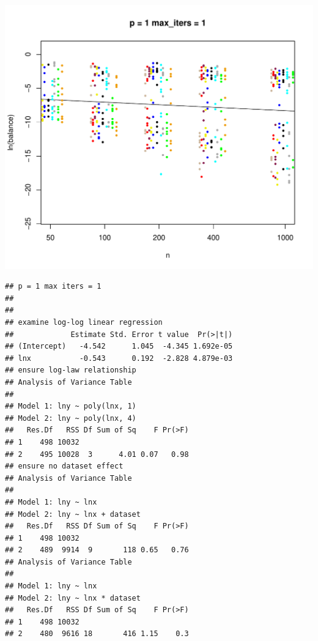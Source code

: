 \documentclass{article}\usepackage[]{graphicx}\usepackage[]{color}
\makeatletter
\def\maxwidth{ %
  \ifdim\Gin@nat@width>\linewidth
    \linewidth
  \else
    \Gin@nat@width
  \fi
}
\newenvironment{kframe}{%
 \def\at@end@of@kframe{}%
 \ifinner\ifhmode%
  \def\at@end@of@kframe{\end{minipage}}%
  \begin{minipage}{\columnwidth}%
 \fi\fi%
 \def\FrameCommand##1{\hskip\@totalleftmargin \hskip-\fboxsep
 \colorbox{shadecolor}{##1}\hskip-\fboxsep
     \hskip-\linewidth \hskip-\@totalleftmargin \hskip\columnwidth}%
 \MakeFramed {\advance\hsize-\width
   \@totalleftmargin\z@ \linewidth\hsize
   \@setminipage}}%
 {\par\unskip\endMakeFramed%
 \at@end@of@kframe}
\newenvironment{knitrout}{}{} %
\makeatother
\begin{document}
\begin{knitrout}
\includegraphics[width=\maxwidth]{figure/load_and_cleanup_data9} 
\begin{kframe}\begin{verbatim}
## p = 1 max iters = 1 
## 
## 
## examine log-log linear regression
##             Estimate Std. Error t value  Pr(>|t|)
## (Intercept)   -4.542      1.045  -4.345 1.692e-05
## lnx           -0.543      0.192  -2.828 4.879e-03
## ensure log-law relationship
## Analysis of Variance Table
## 
## Model 1: lny ~ poly(lnx, 1)
## Model 2: lny ~ poly(lnx, 4)
##   Res.Df   RSS Df Sum of Sq    F Pr(>F)
## 1    498 10032                         
## 2    495 10028  3      4.01 0.07   0.98
## ensure no dataset effect
## Analysis of Variance Table
## 
## Model 1: lny ~ lnx
## Model 2: lny ~ lnx + dataset
##   Res.Df   RSS Df Sum of Sq    F Pr(>F)
## 1    498 10032                         
## 2    489  9914  9       118 0.65   0.76
## Analysis of Variance Table
## 
## Model 1: lny ~ lnx
## Model 2: lny ~ lnx * dataset
##   Res.Df   RSS Df Sum of Sq    F Pr(>F)
## 1    498 10032                         
## 2    480  9616 18       416 1.15    0.3
\end{verbatim}
\end{kframe}

\end{knitrout}
\end{document}
